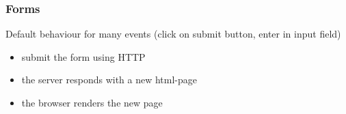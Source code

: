 \begin{frame}[fragile]
\frametitle{Forms}
\color{structure}

Default behaviour for many events (click on submit button, enter in input field)
\begin{itemize}
  \item submit the form using HTTP
  \item the server responds with a new html-page
  \item the browser renders the new page
\end{itemize}

\end{frame}
